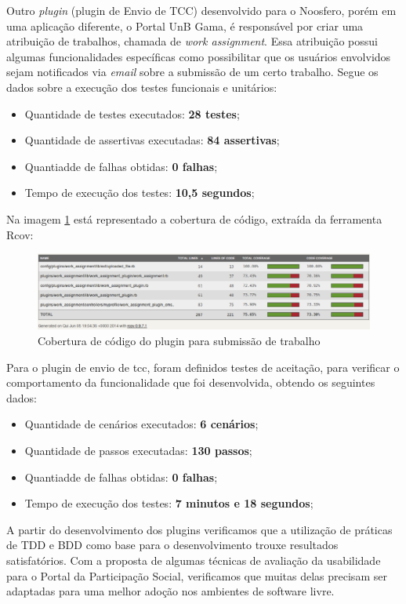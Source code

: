 Outro \textit{plugin} (plugin de Envio de TCC) desenvolvido para o Noosfero, porém em uma aplicação diferente, o Portal UnB Gama, é responsável por criar uma atribuição de trabalhos, chamada de \textit{work assignment}. Essa atribuição possui algumas funcionalidades específicas como possibilitar que os usuários envolvidos sejam notificados via \textit{email} sobre a submissão de um certo trabalho. Segue os dados sobre a execução dos testes funcionais e unitários:

\begin{itemize}
\item Quantidade de testes executados: \textbf{28 testes};
\item Quantidade de assertivas executadas: \textbf{84 assertivas};
\item Quantiadde de falhas obtidas: \textbf{0 falhas};
\item Tempo de execução dos testes: \textbf{10,5 segundos};
\end{itemize}

Na imagem \ref{consideracoes_cobertura2} está representado a cobertura de código, extraída da ferramenta Rcov:

\begin{figure}[!h]
    \centering
    \includegraphics[keepaspectratio=false,scale=0.45]
      {images/cobertura_tcc.eps}
    \caption{Cobertura de código do plugin para submissão de trabalho}
    \label{consideracoes_cobertura2}
\end{figure}

Para o plugin de envio de tcc, foram definidos testes de aceitação, para verificar o comportamento da funcionalidade que foi desenvolvida, obtendo os seguintes dados:

\begin{itemize}
\item Quantidade de cenários executados: \textbf{6 cenários};
\item Quantidade de passos executadas: \textbf{130 passos};
\item Quantiadde de falhas obtidas: \textbf{0 falhas};
\item Tempo de execução dos testes: \textbf{7 minutos e 18 segundos};
\end{itemize}

A partir do desenvolvimento dos plugins verificamos que a utilização de práticas de TDD e BDD como base para o desenvolvimento trouxe resultados satisfatórios. Com a proposta de algumas técnicas de avaliação da usabilidade para o Portal da Participação Social, verificamos que muitas delas precisam ser adaptadas para uma melhor adoção nos ambientes de software livre.
